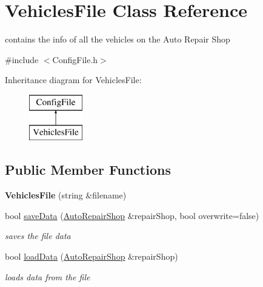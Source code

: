 \hypertarget{class_vehicles_file}{}\section{Vehicles\+File Class Reference}
\label{class_vehicles_file}


contains the info of all the vehicles on the Auto Repair Shop  




{\ttfamily \#include $<$Config\+File.\+h$>$}

Inheritance diagram for Vehicles\+File\+:\begin{figure}[H]
\begin{center}
\leavevmode
\includegraphics[height=2.000000cm]{class_vehicles_file}
\end{center}
\end{figure}
\subsection*{Public Member Functions}
\begin{DoxyCompactItemize}
\item 
\hypertarget{class_vehicles_file_ab2e1263800fe0705f6c8008e19e611f0}{}{\bfseries Vehicles\+File} (string \&filename)\label{class_vehicles_file_ab2e1263800fe0705f6c8008e19e611f0}

\item 
\hypertarget{class_vehicles_file_afcb5e23825c05522296c543841b85939}{}bool \hyperlink{class_vehicles_file_afcb5e23825c05522296c543841b85939}{save\+Data} (\hyperlink{class_auto_repair_shop}{Auto\+Repair\+Shop} \&repair\+Shop, bool overwrite=false)\label{class_vehicles_file_afcb5e23825c05522296c543841b85939}

\begin{DoxyCompactList}\small\item\em saves the file data \end{DoxyCompactList}\item 
bool \hyperlink{class_vehicles_file_a4299cf7cbc0ce9123d753f0aba2b95cf}{load\+Data} (\hyperlink{class_auto_repair_shop}{Auto\+Repair\+Shop} \&repair\+Shop)
\begin{DoxyCompactList}\small\item\em loads data from the file \end{DoxyCompactList}\end{DoxyCompactItemize}
